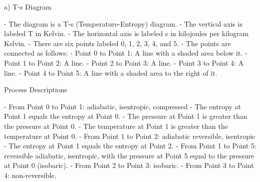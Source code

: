 a) T-s Diagram

- The diagram is a T-s (Temperature-Entropy) diagram.
- The vertical axis is labeled T in Kelvin.
- The horizontal axis is labeled s in kilojoules per kilogram Kelvin.
- There are six points labeled 0, 1, 2, 3, 4, and 5.
- The points are connected as follows:
  - Point 0 to Point 1: A line with a shaded area below it.
  - Point 1 to Point 2: A line.
  - Point 2 to Point 3: A line.
  - Point 3 to Point 4: A line.
  - Point 4 to Point 5: A line with a shaded area to the right of it.

Process Descriptions

- From Point 0 to Point 1: adiabatic, isentropic, compressed
  - The entropy at Point 1 equals the entropy at Point 0.
  - The pressure at Point 1 is greater than the pressure at Point 0.
  - The temperature at Point 1 is greater than the temperature at Point 0.
- From Point 1 to Point 2: adiabatic reversible, isentropic
  - The entropy at Point 1 equals the entropy at Point 2.
- From Point 1 to Point 5: reversible adiabatic, isentropic, with the pressure at Point 5 equal to the pressure at Point 0 (isobaric).
- From Point 2 to Point 3: isobaric.
- From Point 3 to Point 4: non-reversible.
